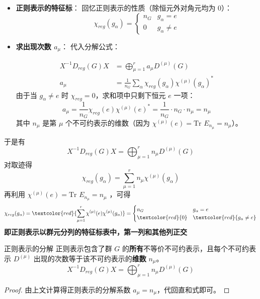 \begin{itemize}
    \item \textbf{正则表示的特征标}：
    回忆正则表示的性质（除恒元外对角元均为 0）：
    \begin{equation}
        \chi_{reg}(g_\alpha) = \begin{cases} n_G & g_\alpha = e \\ 0 & g_\alpha \neq e \end{cases}
    \end{equation}
    
    \item \textbf{求出现次数 $a_\mu$}：
    代入分解公式：

    \begin{equation}
\begin{aligned}
X^{-1} D_{reg}(G) X &= \bigoplus_{\mu=1}^r a_{\mu} D^{(\mu)}(G) \\
a_\mu &= \frac{1}{n_G} \sum_{\alpha} \chi_{reg}(g_\alpha) \chi^{(\mu)}(g_\alpha)^*
\end{aligned}
    \end{equation}
    由于当 $g_\alpha \neq e$ 时 $\chi_{reg}=0$，求和项中只剩下恒元 $e$ 一项：
    \begin{equation}
        a_\mu = \frac{1}{n_G} \chi_{reg}(e) \chi^{(\mu)}(e)^* = \frac{1}{n_G} \cdot n_G \cdot n_\mu = n_\mu
    \end{equation}
    其中 $n_\mu$ 是第 $\mu$ 个不可约表示的维数（因为 $\chi^{(\mu)}(e) = \text{Tr } E_{n_\mu} = n_\mu$）。
\end{itemize}
于是有
\begin{equation}
  X^{-1} D_{reg}(G) X = \bigoplus_{\mu=1}^r n_\mu D^{(\mu)}(G)
\end{equation}
对取迹得
\begin{equation}
  \chi_{reg}(g_\alpha) = \sum_{\mu=1}^r n_\mu \chi^{(\mu)}(g_\alpha)
\end{equation}
再利用 $\chi^{(\mu)}(e) = \text{Tr } E_{n_\mu} = n_\mu$ ，可得
\begin{equation}
  \chi_{reg}(g_\alpha) = \textcolor{red}{\sum_{\mu=1}^r \chi^{(\mu)}(e) \chi^{(\mu)}(g_\alpha)} = \begin{cases} n_G & g_\alpha = e \\ \textcolor{red}{0 }& \textcolor{red}{g_\alpha \neq e} \end{cases}
\end{equation}
\textbf{即正则表示以群元分列的特征标表中，第一列和其他列正交}
\begin{corollary}{正则表示的分解}
    正则表示包含了群 $G$ 的\textbf{所有}不等价不可约表示，且每个不可约表示 $D^{(\mu)}$ 出现的次数等于该不可约表示的\textbf{维数} $n_\mu$。
    \begin{equation}
        X^{-1} D_{reg}(G) X = \bigoplus_{\mu=1}^r n_\mu D^{(\mu)}(G)
    \end{equation}
\end{corollary}
\begin{proof}
    由上文计算得正则表示的分解系数 $a_\mu = n_\mu$，代回直和式即可。
\end{proof}

